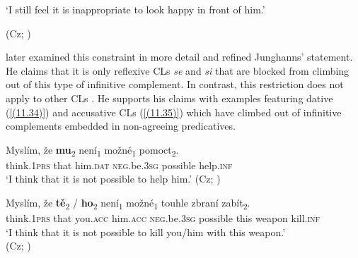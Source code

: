 \begin{exe}\ex
\begin{xlist}
\end{xlist}
\glt ‘I still feel it is inappropriate to look happy in front of him.’ \\
\strut\hfill (Cz; \citealt[77]{Junghanns02})
\end{exe}

\noindent \citet[82]{Dotlacil04} later examined this constraint in more detail and refined Junghanns’ statement. He claims that it is only reflexive CLs \textit{se} and \textit{si} that are blocked from climbing out of this type of infinitive complement. In contrast, this restriction does not apply to other CLs \citep[cf.][82]{Dotlacil04}. He supports his claims with examples featuring dative (\ref{(11.34)}) and accusative CLs (\ref{(11.35)}) which have climbed out of infinitive complements embedded in non-agreeing predicatives. 

\begin{exe}\ex\label{(11.34)}
\gll Myslím, že \textbf{mu}\textsubscript{2} není\textsubscript{1} možné\textsubscript{1} pomoct\textsubscript{2}. \\
 think.1\textsc{prs} that him.\textsc{dat} \textsc{neg}.be.3\textsc{sg} possible help.\textsc{inf}\\
\glt ‘I think that it is not possible to help him.’
\hfill (Cz; \citealt[82]{Dotlacil04})

\ex\label{(11.35)}
\gll Myslím, že \textbf{tě}\textsubscript{2} / \textbf{ho}\textsubscript{2} není\textsubscript{1} možné\textsubscript{1} touhle zbraní zabít\textsubscript{2}. \\
think.1\textsc{prs} that you.\textsc{acc} {} him.\textsc{acc} \textsc{neg}.be.3\textsc{sg} possible this weapon kill.\textsc{inf}\\
\glt ‘I think that it is not possible to kill you/him with this weapon.’ \\
\hfill (Cz; \citealt[82]{Dotlacil04})
\end{exe}

